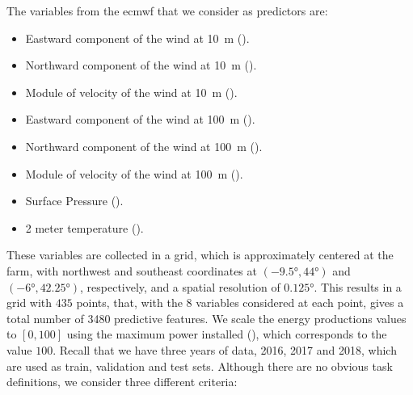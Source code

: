 The variables from the \acrshort{ecmwf} that we consider as predictors are:
\begin{itemize}
    \item	Eastward component of the wind at \si{10\metre} %
     ().
    \item	Northward  component of the wind at \si{10\metre} ().
    \item   Module of velocity of the wind at \si{10\metre} ().
    \item	Eastward  component of the wind at \si{100\metre} ().
    \item	Northward component of the wind at \si{100\metre} ().
    \item   Module of velocity of the wind at \si{100\metre} ().
    \item   Surface {Pressure} ().
    \item	2 meter {temperature} ().
\end{itemize}
These variables are collected in a grid, which is approximately centered at the farm, with northwest and southeast coordinates at $(\ang{-9.5}, \ang{44})$ and $(\ang{-6}, \ang{42.25})$, respectively, and a spatial resolution of $\ang{0.125}$.
This results in a grid with $435$ points, that, with the $8$ variables considered at each point, gives a total number of {3480} predictive features.
We scale the energy productions values to $[0, 100]$ using the maximum power installed (), which corresponds to the value $100$.
%
Recall that we have three years of data, 2016, 2017 and 2018, which are used as train, validation and test sets.
%
Although there are no obvious task definitions, we consider three different criteria:
